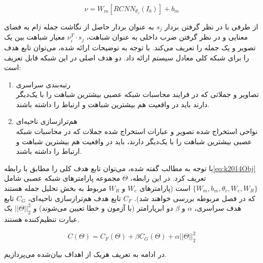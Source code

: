 \begin{equation}
\nu = W_m[RCNN_{\theta_c}(I_b)] + b_m
\label{eq:k2014ISV}
\end{equation}

از طرفی با در نظر گرفتن بردار $s_j$ به عنوان بردار حاصل از نگاشت جمله $j$ام به فضای معنایی و در نظر گرفتن ضرب داخلی به عنوان شباهت، $\nu_i^T \cdot s_j$
معیار شباهت بین یک تصویر و یک جمله را تعریف می‌کند.
با توجه به توضیحات ارائه شده، می‌توان تابع هدف را برای شبکه کلی معادل سیستم ارائه داد. دو هدف اصلی در این شبکه قابل تعریف است:
\begin{enumerate}
\item رتبه‌بندی سراسری\\
 تصاویر و جملاتی که در فرایند محاسبات شبکه عصبی بیشترین شباهت را با یک‌دیگر دارند باید در واقعیت هم بیشترین شباهت و ارتباط را داشته باشند.
\item هم‌ترازسازی ناحیه‌ای\\
نواحی استخراج شده تصویر و عبارات استخراج شده جملات که در محاسبات شبکه عصبی بیشترین شباهت را با یک‌دیگر دارند، باید در واقعیت هم بیشترین شباهت و ارتباط را داشته باشند.
\end{enumerate}

با توجه به مطالب گفته شده، می‌توان تابع هدف کلی را مطابق با رابطه\ref{eq:k2014Obj}
تعریف کرد.
در این رابطه، $\Theta$ مجموعه پارامترهای شبکه عصبی شامل 
$\{W_m,b_m,\theta_c,W_e,W_R\}$
است (پارامترهای $W_e$ و‌ $W_R$ مربوط به بخش تحلیل جمله هستند که در فصل مربوطه بررسی خواهند شد). $C_F$ تابع هدف هم‌ترازسازی ناحیه‌ای، $C_G$ تابع هدف سراسری، $\alpha$ و $\beta$ دو ابرپارامتر (با آزمون و خطا تعیین می‌شوند) و $||\Theta||_2^2$ یک عبارت تنظیم‌کننده هستند.

\begin{equation}
C(\Theta) = C_F(\Theta) + \beta C_G(\Theta) + \alpha ||\Theta||_2^2
\label{eq:k2014Obj}
\end{equation}

در ادامه به تعریف هریک از اهداف بیان‌شده می‌پردازیم.

